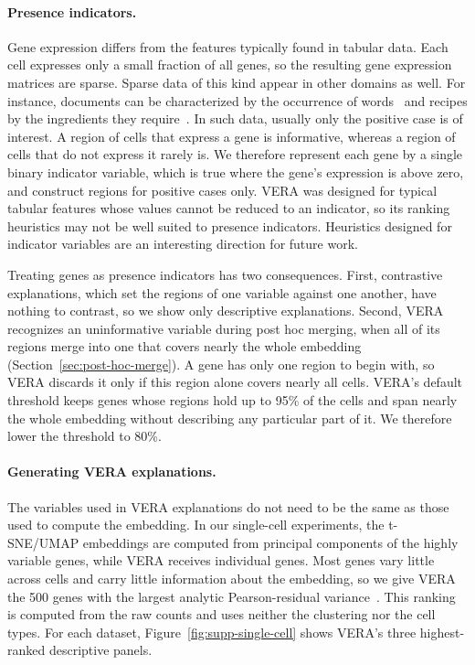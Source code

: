 \documentclass[10pt]{article}
\begin{document}
\paragraph{Presence indicators.}
Gene expression differs from the features typically found in tabular data. 
Each cell expresses only a small fraction of all genes, so the resulting gene expression matrices are sparse.
Sparse data of this kind appear in other domains as well. For instance, documents can be characterized by the occurrence of words~\cite{Heimerl2016} and recipes by the ingredients they require~\cite{Ahn2011}.
In such data, usually only the positive case is of interest. A region of cells that express a gene is informative, whereas a region of cells that do not express it rarely is.
We therefore represent each gene by a single binary indicator variable, which is true where the gene's expression is above zero, and construct regions for positive cases only.
VERA was designed for typical tabular features whose values cannot be reduced to an indicator, so its ranking heuristics may not be well suited to presence indicators. Heuristics designed for indicator variables are an interesting direction for future work.

Treating genes as presence indicators has two consequences.
First, contrastive explanations, which set the regions of one variable against one another, have nothing to contrast, so we show only descriptive explanations.
Second, VERA recognizes an uninformative variable during post hoc merging, when all of its regions merge into one that covers nearly the whole embedding (Section~\ref{sec:post-hoc-merge}). A gene has only one region to begin with, so VERA discards it only if this region alone covers nearly all cells. VERA's default threshold keeps genes whose regions hold up to 95\% of the cells and span nearly the whole embedding without describing any particular part of it. We therefore lower the threshold to 80\%.

\paragraph{Generating VERA explanations.}
The variables used in VERA explanations do not need to be the same as those used to compute the embedding. In our single-cell experiments, the t-SNE/UMAP embeddings are computed from principal components of the highly variable genes, while VERA receives individual genes.
Most genes vary little across cells and carry little information about the embedding, so we give VERA the 500 genes with the largest analytic Pearson-residual variance~\cite{Lause2021}. This ranking is computed from the raw counts and uses neither the clustering nor the cell types.
For each dataset, Figure~\ref{fig:supp-single-cell} shows VERA's three highest-ranked descriptive panels.
\end{document}
